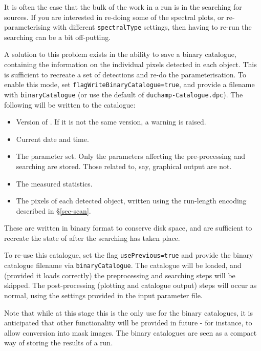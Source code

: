 \label{sec-reuse}



It is often the case that the bulk of the work in a \duchamp run is in
the searching for sources. If you are interested in re-doing some of
the spectral plots, or re-parameterising with different
\texttt{spectralType} settings, then having to re-run the searching
can be a bit off-putting. 

A solution to this problem exists in the ability to save a binary
catalogue, containing the information on the individual pixels
detected in each object. This is sufficient to recreate a set of
detections and re-do the parameterisation. To enable this mode, set
\texttt{flagWriteBinaryCatalogue=true}, and provide a filename with
\texttt{binaryCatalogue} (or use the default of
\texttt{duchamp-Catalogue.dpc}). The following will be written to the
catalogue: 
\begin{itemize}
\item Version of \duchamp. If it is not the same version, a warning is raised.
\item Current date and time.
\item The parameter set. Only the parameters affecting the
  pre-processing and searching are stored. Those related to, say,
  graphical output are not.
\item The measured statistics.
\item The pixels of each detected object, written using the run-length
  encoding described in \S\ref{sec-scan}.
\end{itemize}
These are written in binary format to conserve disk space, and are
sufficient to recreate the state of \duchamp after the searching has
taken place. 

To re-use this catalogue, set the flag \texttt{usePrevious=true} and
provide the binary catalogue filename via
\texttt{binaryCatalogue}. The catalogue will be loaded, and (provided
it loads correctly) the preprocessing and searching steps will be
skipped. The post-processing (\ie plotting and catalogue output) steps
will occur as normal, using the settings provided in the input
parameter file.

Note that while at this stage this is the only use for the binary
catalogues, it is anticipated that other functionality will be
provided in future - for instance, to allow conversion into mask
images. The binary catalogues are seen as a compact way of storing the
results of a \duchamp run. 

